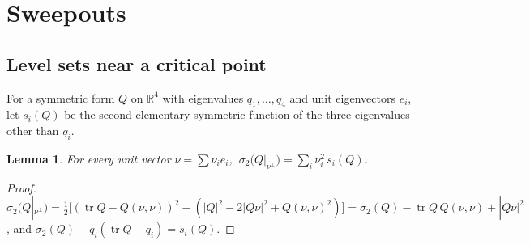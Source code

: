 \documentclass[11pt,letterpaper]{article}
\numberwithin{equation}{section}
\newtheorem{lemma}[theorem]{Lemma}
\theoremstyle{definition}
\DeclareMathOperator{\tr}{tr}
\begin{document}
\section{Sweepouts}\label{sec:sweepouts}

\subsection{Level sets near a critical point}
For a symmetric form \(Q\) on \(\mathbb R^4\) with eigenvalues
\(q_1,\dots,q_4\) and unit eigenvectors \(e_i\), let \(s_i(Q)\) be the
second elementary symmetric function of the three eigenvalues other than
\(q_i\).

\begin{lemma}\label{lem:restriction}
For every unit vector \(\nu=\sum\nu_ie_i\),
\(\ \sigma_2\bigl(Q|_{\nu^\perp}\bigr)=\sum_i\nu_i^2\,s_i(Q)\).
\end{lemma}
\begin{proof}
\(\sigma_2(Q|_{\nu^\perp})=\tfrac12\bigl[(\tr Q-Q(\nu,\nu))^2-(|Q|^2-2|Q\nu|^2+Q(\nu,\nu)^2)\bigr]
=\sigma_2(Q)-\tr Q\,Q(\nu,\nu)+|Q\nu|^2\), and
\(\sigma_2(Q)-q_i(\tr Q-q_i)=s_i(Q)\).
\end{proof}
\end{document}
